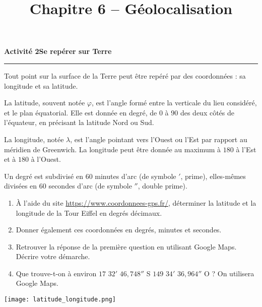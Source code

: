 \documentclass[a4paper]{article}
\begin{document}
\title{Chapitre 6 -- Géolocalisation}

\pagestyle{empty}

\date{}
\author{}

\maketitle{}

\thispagestyle{empty}
\noindent\textbf{Activité 2}\hfill{}\textbf{Se repérer sur Terre}
\smallskip
\hrule
\medskip

\begin{multicols}{2}

Tout point sur la surface de la Terre peut être repéré par des coordonnées : sa longitude et sa latitude.

\bigskip

La latitude, souvent notée $\varphi$, est l'angle formé entre la verticale du lieu considéré, et le plan équatorial. Elle est donnée en degré, de $0$\degree{} à $90$\degree{} des deux côtés de l'équateur, en précisant la latitude Nord ou Sud.

\bigskip

La longitude, notée $\lambda$, est l'angle \og{}pointant\fg{} vers l'Ouest ou l'Est par rapport au méridien de Greenwich. La longitude peut être donnée au maximum à $180$\degree{} à l'Est et à $180$\degree{} à l'Ouest.

\bigskip

Un degré est subdivisé en $60$ minutes d'arc (de symbole $'$, \og{}prime\fg{}), elles-mêmes divisées en $60$ secondes d'arc (de symbole $''$, \og{}double prime\fg{}).

\begin{enumerate}
  \item À l'aide du site \url{https://www.coordonnees-gps.fr/}, déterminer la latitude et la longitude de la Tour Eiffel en degrés décimaux.
  \item Donner également ces coordonnées en degrés, minutes et secondes.
  \item Retrouver la réponse de la première question en utilisant Google Maps. Décrire votre démarche.
  \item Que trouve-t-on à environ $17$\degree{} $32'$ $46,748''$ S $149$\degree{} $34'$ $36,964''$ O ? On utilisera Google Maps.
\end{enumerate}

\begin{center}
  \texttt{[image: latitude\_longitude.png]}
\end{center}

\end{multicols}
\end{document}
